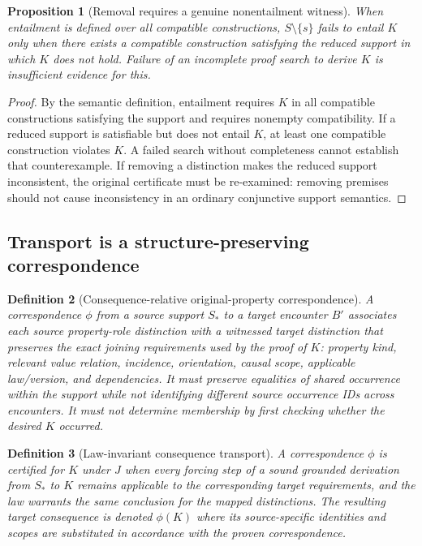 \documentclass[11pt]{article}
\newtheorem{definition}{Definition}[section]
\newtheorem{proposition}[definition]{Proposition}
\begin{document}
\begin{proposition}[Removal requires a genuine nonentailment witness]
When entailment is defined over all compatible constructions,
$S\setminus\{s\}$ fails to entail $K$ only when there exists
a compatible construction satisfying the reduced support
in which $K$ does not hold. Failure of an incomplete proof
search to derive $K$ is insufficient evidence for this.
\end{proposition}
\begin{proof}
By the semantic definition, entailment requires $K$
in all compatible constructions satisfying the support
and requires nonempty compatibility. If a reduced
support is satisfiable but does not entail $K$, at
least one compatible construction violates $K$.
A failed search without completeness cannot establish
that counterexample. If removing a distinction makes
the reduced support inconsistent, the original
certificate must be re-examined: removing premises
should not cause inconsistency in an ordinary
conjunctive support semantics.
\end{proof}

\subsection{Transport is a structure-preserving correspondence}
\begin{definition}[Consequence-relative original-property correspondence]
A correspondence $\phi$ from a source support $S_*$ to
a target encounter $B'$ associates each source
\emph{property-role distinction} with a witnessed
target distinction that preserves the exact joining
requirements used by the proof of $K$: property kind,
relevant value relation, incidence, orientation,
causal scope, applicable law/version, and dependencies.
It must preserve equalities of shared occurrence
\emph{within the support} while not identifying
different source occurrence IDs across encounters.
It must not determine membership by first checking
whether the desired $K$ occurred.
\end{definition}

\begin{definition}[Law-invariant consequence transport]
A correspondence $\phi$ is certified for $K$ under $J$
when every forcing step of a sound grounded derivation
from $S_*$ to $K$ remains applicable to the corresponding
target requirements, and the law warrants the same
conclusion for the mapped distinctions. The resulting
target consequence is denoted $\phi(K)$ where its
source-specific identities and scopes are substituted
in accordance with the proven correspondence.
\end{definition}
\end{document}
